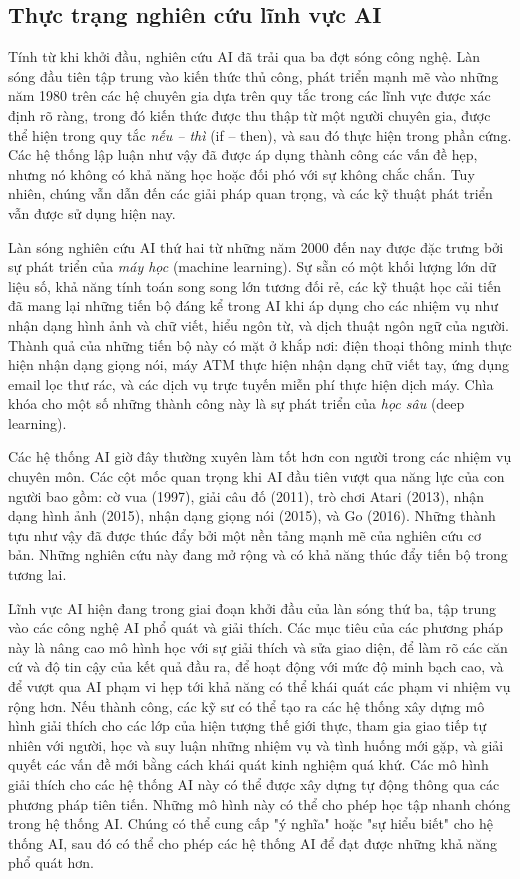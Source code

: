 \subsection{Thực trạng nghiên cứu lĩnh vực AI}
Tính từ khi khởi đầu, nghiên cứu AI đã trải qua ba đợt sóng công nghệ. Làn sóng đầu tiên tập trung vào kiến thức thủ công, phát triển mạnh mẽ vào những năm 1980 trên các hệ chuyên gia dựa trên quy tắc trong các lĩnh vực được xác định rõ ràng, trong đó kiến thức được thu thập từ một người chuyên gia, được thể hiện trong quy tắc \textit{nếu – thì} (if – then), và sau đó thực hiện trong phần cứng. Các hệ thống lập luận như vậy đã được áp dụng thành công các vấn đề hẹp, nhưng nó không có khả năng học hoặc đối phó với sự không chắc chắn. Tuy nhiên, chúng vẫn dẫn đến các giải pháp quan trọng, và các kỹ thuật phát triển vẫn được sử dụng hiện nay.\par
Làn sóng nghiên cứu AI thứ hai từ những năm 2000 đến nay được đặc trưng bởi sự phát triển của \textit{máy học} (machine learning). Sự sẵn có một khối lượng lớn dữ liệu số, khả năng tính toán song song lớn tương đối rẻ, các kỹ thuật học cải tiến đã mang lại những tiến bộ đáng kể trong AI khi áp dụng cho các nhiệm vụ như nhận dạng hình ảnh và chữ viết, hiểu ngôn từ, và dịch thuật ngôn ngữ của người. Thành quả của những tiến bộ này có mặt ở khắp nơi: điện thoại thông minh thực hiện nhận dạng giọng nói, máy ATM thực hiện nhận dạng chữ viết tay, ứng dụng email lọc thư rác, và các dịch vụ trực tuyến miễn phí thực hiện dịch máy. Chìa khóa cho một số những thành công này là sự phát triển của \textit{học sâu} (deep learning).\par
Các hệ thống AI giờ đây thường xuyên làm tốt hơn con người trong các nhiệm vụ chuyên môn. Các cột mốc quan trọng khi AI đầu tiên vượt qua năng lực của con người bao gồm: cờ vua (1997), giải câu đố (2011), trò chơi Atari (2013), nhận dạng hình ảnh (2015), nhận dạng giọng nói (2015), và Go (2016). Những thành tựu như vậy đã được thúc đẩy bởi một nền tảng mạnh mẽ của nghiên cứu cơ bản. Những nghiên cứu này đang mở rộng và có khả năng thúc đẩy tiến bộ trong tương lai.\par
Lĩnh vực AI hiện đang trong giai đoạn khởi đầu của làn sóng thứ ba, tập trung vào các công nghệ AI phổ quát và giải thích. Các mục tiêu của các phương pháp này là nâng cao mô hình học với sự giải thích và sửa giao diện, để làm rõ các căn cứ và độ tin cậy của kết quả đầu ra, để hoạt động với mức độ minh bạch cao, và để vượt qua AI phạm vi hẹp tới khả năng có thể khái quát các phạm vi nhiệm vụ rộng hơn. Nếu thành công, các kỹ sư có thể tạo ra các hệ thống xây dựng mô hình giải thích cho các lớp của hiện tượng thế giới thực, tham gia giao tiếp tự nhiên với người, học và suy luận những nhiệm vụ và tình huống mới gặp, và giải quyết các vấn đề mới bằng cách khái quát kinh nghiệm quá khứ. Các mô hình giải thích cho các hệ thống AI này có thể được xây dựng tự động thông qua các phương pháp tiên tiến. Những mô hình này có thể cho phép học tập nhanh chóng trong hệ thống AI. Chúng có thể cung cấp "ý nghĩa" hoặc "sự hiểu biết" cho hệ thống AI, sau đó có thể cho phép các hệ thống AI để đạt được những khả năng phổ quát hơn.\par

